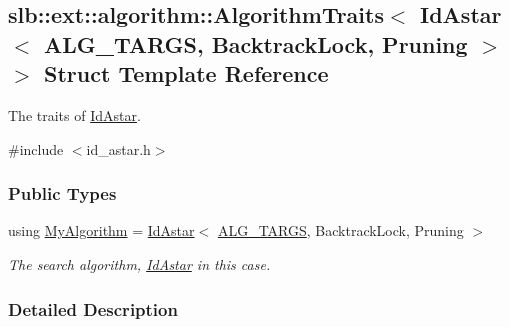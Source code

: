 \hypertarget{structslb_1_1ext_1_1algorithm_1_1AlgorithmTraits_3_01IdAstar_3_01ALG__TARGS_00_01BacktrackLock_00_01Pruning_01_4_01_4}{}\subsection{slb\+:\+:ext\+:\+:algorithm\+:\+:Algorithm\+Traits$<$ Id\+Astar$<$ A\+L\+G\+\_\+\+T\+A\+R\+GS, Backtrack\+Lock, Pruning $>$ $>$ Struct Template Reference}
\label{structslb_1_1ext_1_1algorithm_1_1AlgorithmTraits_3_01IdAstar_3_01ALG__TARGS_00_01BacktrackLock_00_01Pruning_01_4_01_4}


The traits of \hyperlink{structslb_1_1ext_1_1algorithm_1_1IdAstar}{Id\+Astar}.  




{\ttfamily \#include $<$id\+\_\+astar.\+h$>$}

\subsubsection*{Public Types}
\begin{DoxyCompactItemize}
\item 
using \hyperlink{structslb_1_1ext_1_1algorithm_1_1AlgorithmTraits_3_01IdAstar_3_01ALG__TARGS_00_01BacktrackLock_00_01Pruning_01_4_01_4_a084061b64a8a7b3b3004919b6c0b45ee}{My\+Algorithm} = \hyperlink{structslb_1_1ext_1_1algorithm_1_1IdAstar}{Id\+Astar}$<$ \hyperlink{algorithm_8h_a425b5a86fe8dae889a8343e14267c3c0}{A\+L\+G\+\_\+\+T\+A\+R\+GS}, Backtrack\+Lock, Pruning $>$\hypertarget{structslb_1_1ext_1_1algorithm_1_1AlgorithmTraits_3_01IdAstar_3_01ALG__TARGS_00_01BacktrackLock_00_01Pruning_01_4_01_4_a084061b64a8a7b3b3004919b6c0b45ee}{}\label{structslb_1_1ext_1_1algorithm_1_1AlgorithmTraits_3_01IdAstar_3_01ALG__TARGS_00_01BacktrackLock_00_01Pruning_01_4_01_4_a084061b64a8a7b3b3004919b6c0b45ee}

\begin{DoxyCompactList}\small\item\em The search algorithm, \hyperlink{structslb_1_1ext_1_1algorithm_1_1IdAstar}{Id\+Astar} in this case. \end{DoxyCompactList}\end{DoxyCompactItemize}


\subsubsection{Detailed Description}
